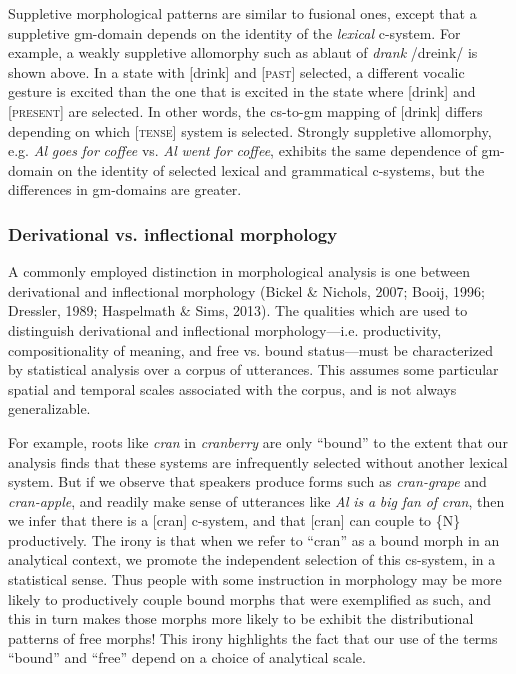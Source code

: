   Suppletive morphological patterns are similar to fusional ones, except that a suppletive gm-domain depends on the identity of the \textit{lexical} c-system. For example, a weakly suppletive allomorphy such as ablaut of \textit{drank} /dreink/ is shown above. In a state with [drink] and [\textsc{past}] selected, a different vocalic gesture is excited than the one that is excited in the state where [drink] and [\textsc{present}] are selected. In other words, the cs-to-gm mapping of [drink] differs depending on which [\textsc{tense}] system is selected. Strongly suppletive allomorphy, e.g. \textit{Al} \textit{goes} \textit{for} \textit{coffee} vs. \textit{Al} \textit{went} \textit{for} \textit{coffee}, exhibits the same dependence of gm-domain on the identity of selected lexical and grammatical c-systems, but the differences in gm-domains are greater.

\subsubsection{Derivational vs. inflectional morphology}

A commonly employed distinction in morphological analysis is one between derivational and inflectional morphology (Bickel \& Nichols, 2007; Booij, 1996; Dressler, 1989; Haspelmath \& Sims, 2013). The qualities which are used to distinguish derivational and inflectional morphology—i.e. productivity, compositionality of meaning, and free vs. bound status—must be characterized by statistical analysis over a corpus of utterances. This assumes some particular spatial and temporal scales associated with the corpus, and is not always generalizable. 

  For example, roots like \textit{cran} in \textit{cranberry} are only “bound” to the extent that our analysis finds that these systems are infrequently selected without another lexical system. But if we observe that speakers produce forms such as \textit{cran-grape} and \textit{cran-apple}, and readily make sense of utterances like \textit{Al} \textit{is} \textit{a} \textit{big} \textit{fan} \textit{of} \textit{cran}, then we infer that there is a [cran] c-system, and that [cran] can couple to \{N\} productively. The irony is that when we refer to “cran” as a bound morph in an analytical context, we promote the independent selection of this cs-system, in a statistical sense. Thus people with some instruction in morphology may be more likely to productively couple bound morphs that were exemplified as such, and this in turn makes those morphs more likely to be exhibit the distributional patterns of free morphs! This irony highlights the fact that our use of the terms “bound” and “free” depend on a choice of analytical scale.

